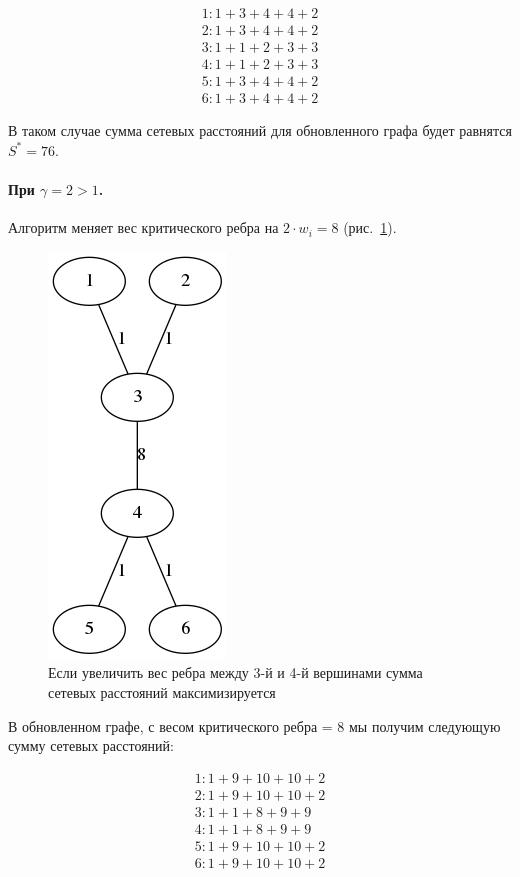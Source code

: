 \documentclass[12pt]{article}
\begin{document}
\begin{gather}
1 : 1 + 3 + 4 + 4 + 2 \\
2 : 1 + 3 + 4 + 4 + 2 \\
3 : 1 + 1 + 2 + 3 + 3 \\
4 : 1 + 1 + 2 + 3 + 3 \\
5 : 1 + 3 + 4 + 4 + 2 \\
6 : 1 + 3 + 4 + 4 + 2
\end{gather}

В таком случае сумма сетевых расстояний для обновленного графа будет равнятся $S^* = 76$.

\paragraph{При $\gamma = 2 > 1$.}
Алгоритм меняет вес критического ребра на $2 \cdot w_i = 8$ (рис.~\ref{fig:min_graph_8}).

\begin{figure}[h]
    \centering
    \includegraphics[scale=0.7]{min_graph_8.png}
    \caption{Если увеличить вес ребра между 3-й и 4-й вершинами сумма сетевых расстояний максимизируется}
    \label{fig:min_graph_8}
\end{figure}

В обновленном графе, с весом критического ребра = 8 мы получим следующую
сумму сетевых расстояний:

\begin{gather}
1 : 1 + 9 + 10 + 10 + 2 \\
2 : 1 + 9 + 10 + 10 + 2 \\
3 : 1 + 1 + 8  + 9  + 9 \\
4 : 1 + 1 + 8  + 9  + 9 \\
5 : 1 + 9 + 10 + 10 + 2 \\
6 : 1 + 9 + 10 + 10 + 2
\end{gather}
\end{document}
